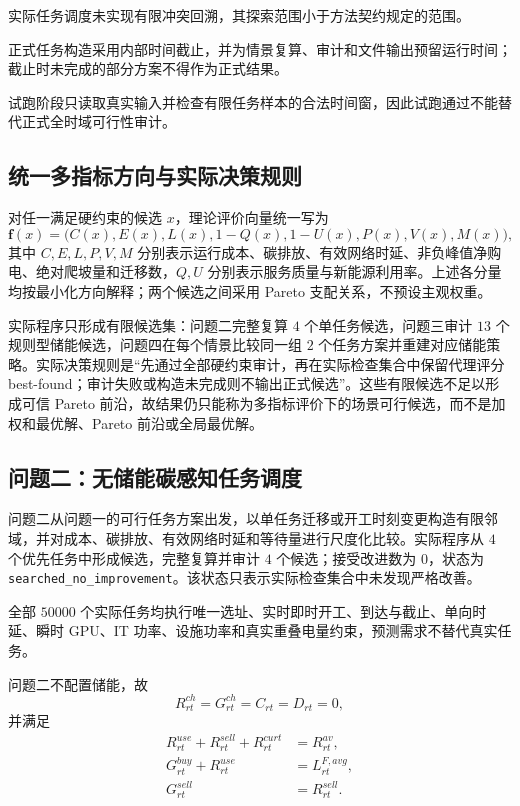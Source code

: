 实际任务调度未实现有限冲突回溯，其探索范围小于方法契约规定的范围。

正式任务构造采用内部时间截止，并为情景复算、审计和文件输出预留运行时间；截止时未完成的部分方案不得作为正式结果。

试跑阶段只读取真实输入并检查有限任务样本的合法时间窗，因此试跑通过不能替代正式全时域可行性审计。


\subsection{统一多指标方向与实际决策规则}

对任一满足硬约束的候选 $x$，理论评价向量统一写为
\begin{equation}
\mathbf f(x)=\bigl(C(x),E(x),L(x),1-Q(x),1-U(x),P(x),V(x),M(x)\bigr),
\end{equation}
其中 $C,E,L,P,V,M$ 分别表示运行成本、碳排放、有效网络时延、非负峰值净购电、绝对爬坡量和迁移数，$Q,U$ 分别表示服务质量与新能源利用率。上述各分量均按最小化方向解释；两个候选之间采用 Pareto 支配关系，不预设主观权重。

实际程序只形成有限候选集：问题二完整复算 $4$ 个单任务候选，问题三审计 $13$ 个规则型储能候选，问题四在每个情景比较同一组 $2$ 个任务方案并重建对应储能策略。实际决策规则是“先通过全部硬约束审计，再在实际检查集合中保留代理评分 best-found；审计失败或构造未完成则不输出正式候选”。这些有限候选不足以形成可信 Pareto 前沿，故结果仍只能称为多指标评价下的场景可行候选，而不是加权和最优解、Pareto 前沿或全局最优解。

\subsection{问题二：无储能碳感知任务调度}

问题二从问题一的可行任务方案出发，以单任务迁移或开工时刻变更构造有限邻域，并对成本、碳排放、有效网络时延和等待量进行尺度化比较。实际程序从 $4$ 个优先任务中形成候选，完整复算并审计 $4$ 个候选；接受改进数为 $0$，状态为 \texttt{searched\_no\_improvement}。该状态只表示实际检查集合中未发现严格改善。

全部 $50000$ 个实际任务均执行唯一选址、实时即时开工、到达与截止、单向时延、瞬时 GPU、IT 功率、设施功率和真实重叠电量约束，预测需求不替代真实任务。

问题二不配置储能，故
\begin{equation}
R_{rt}^{ch}=G_{rt}^{ch}=C_{rt}=D_{rt}=0,
\end{equation}
并满足
\begin{align}
R_{rt}^{use}+R_{rt}^{sell}+R_{rt}^{curt}&=R_{rt}^{av},\\
G_{rt}^{buy}+R_{rt}^{use}&=L_{rt}^{F,avg},\\
G_{rt}^{sell}&=R_{rt}^{sell}.
\end{align}

